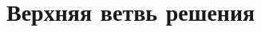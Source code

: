 
\chapter{Верхняя ветвь решения}

\begin{comment}
\section{Введение}

В предыдущей главе, исследуя модельный порыв, удалось получить некоторые представления о его структуре и механизме самоподдержания. В настоящей главе поднимается вопрос об общности полученных результатов. Тот факт, что продольные вихри и пристенные полосы присутствуют как в других инвариантных решениях \cite{Kawahara2012}, так и в пристенной турбулентности \cite{Kline1967, Smith1983, Schoppa2002}, позволяет предполагать, что выделенный механизм генерации пульсаций может быть частично или полностью обобщен на эти случаи. Выполнить строгое исследование турбулентного течения сегодня не представляется возможным, однако полученные результаты могут быть проверены на других инвариантны решения. Опираясь на модельный порыв метод продления в пространстве параметров \cite{Sanchez2004, Viswanath2007, Dijkstra2014} позволяет получить новые локализованные в пространстве инвариантные решения. Среди них могут быть выделены такие, характеристики которых ближе к наблюдаемым в турбулентном течении, что повышает ценность полученных при их исследовании результатов. 


\end{comment}
